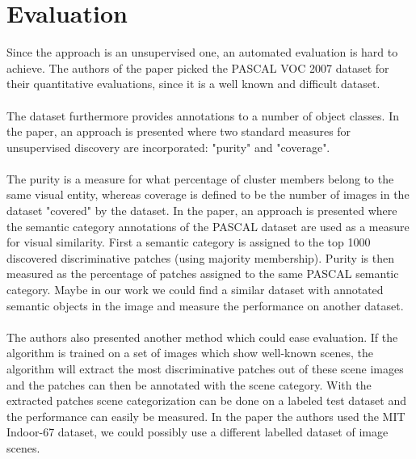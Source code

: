 \section{Evaluation}

Since the approach is an unsupervised one, an automated evaluation is hard to achieve. The authors of the paper 
picked the PASCAL VOC 2007 dataset for their quantitative evaluations, since it is a well known and difficult dataset.\\
\\
The dataset furthermore provides annotations to a number of object classes.
In the paper, an approach is presented where two standard measures for unsupervised discovery are incorporated:
"purity" and "coverage".\\
\\

The purity is a measure for what percentage of cluster members belong to the same visual entity, whereas coverage is defined
to be the number of images in the dataset "covered" by the dataset.
In the paper, an approach is presented where the semantic category annotations of the PASCAL dataset are used as a measure for
visual similarity. First a semantic category is assigned to the top 1000 discovered discriminative patches (using majority membership).
Purity is then measured as the percentage of patches assigned to the same PASCAL semantic category.
Maybe in our work we could find a similar dataset with annotated semantic objects in the image and measure the performance on another dataset.\\
\\
The authors also presented another method which could ease evaluation. If the algorithm is trained on a set of images which show well-known scenes, the algorithm will extract the most discriminative patches out of these scene images and the patches can then be annotated with the scene category. With the extracted patches scene categorization can be done on a labeled test dataset and the performance can easily  be measured. In the paper the authors used the MIT Indoor-67 dataset, we could possibly use a different labelled dataset of image scenes.